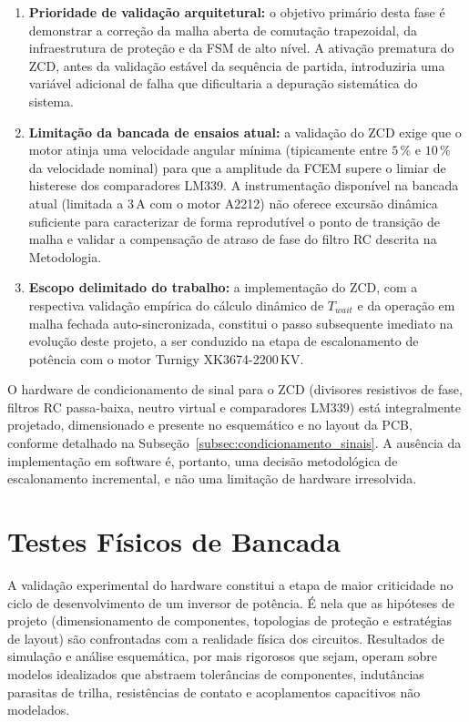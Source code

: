 \begin{enumerate}
    \item \textbf{Prioridade de validação arquitetural:} o objetivo primário desta fase é demonstrar a correção da malha aberta de comutação trapezoidal, da infraestrutura de proteção e da FSM de alto nível. A ativação prematura do ZCD, antes da validação estável da sequência de partida, introduziria uma variável adicional de falha que dificultaria a depuração sistemática do sistema.

    \item \textbf{Limitação da bancada de ensaios atual:} a validação do ZCD exige que o motor atinja uma velocidade angular mínima (tipicamente entre $5\,\%$ e $10\,\%$ da velocidade nominal) para que a amplitude da FCEM supere o limiar de histerese dos comparadores LM339. A instrumentação disponível na bancada atual (limitada a $3\,\text{A}$ com o motor A2212) não oferece excursão dinâmica suficiente para caracterizar de forma reprodutível o ponto de transição de malha e validar a compensação de atraso de fase do filtro RC descrita na Metodologia.

    \item \textbf{Escopo delimitado do trabalho:} a implementação do ZCD, com a respectiva validação empírica do cálculo dinâmico de $T_{wait}$ e da operação em malha fechada auto-sincronizada, constitui o passo subsequente imediato na evolução deste projeto, a ser conduzido na etapa de escalonamento de potência com o motor Turnigy XK3674-2200\,KV.
\end{enumerate}

O hardware de condicionamento de sinal para o ZCD (divisores resistivos de fase, filtros RC passa-baixa, neutro virtual e comparadores LM339) está integralmente projetado, dimensionado e presente no esquemático e no layout da PCB, conforme detalhado na Subseção~\ref{subsec:condicionamento_sinais}. A ausência da implementação em software é, portanto, uma decisão metodológica de escalonamento incremental, e não uma limitação de hardware irresolvida.

\section{Testes Físicos de Bancada}

A validação experimental do hardware constitui a etapa de maior criticidade no ciclo de desenvolvimento de um inversor de potência. É nela que as hipóteses de projeto (dimensionamento de componentes, topologias de proteção e estratégias de layout) são confrontadas com a realidade física dos circuitos. Resultados de simulação e análise esquemática, por mais rigorosos que sejam, operam sobre modelos idealizados que abstraem tolerâncias de componentes, indutâncias parasitas de trilha, resistências de contato e acoplamentos capacitivos não modelados.

